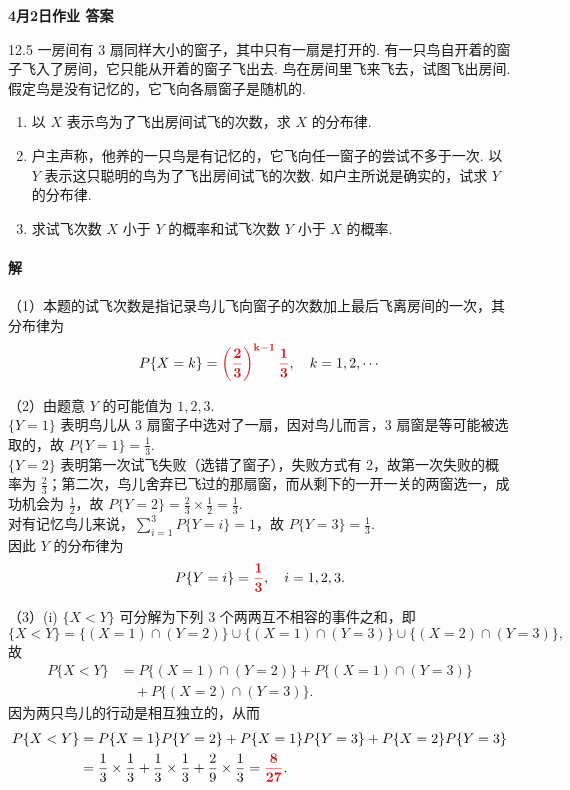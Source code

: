 \documentclass[11pt, UTF8]{ctexart}
\newcommand{\hwdate}{4月2日}
\newcommand{\ans}[1]{\mathbf{\color{fred}#1}}
\begin{document}
\begin{center}
    {\LARGE \bfseries \color{fblue} \hwdate 作业 答案}
\end{center}

\begin{problem}{1}{2.5}
一房间有 $3$ 扇同样大小的窗子，其中只有一扇是打开的. 有一只鸟自开着的窗子飞入了房间，它只能从开着的窗子飞出去. 鸟在房间里飞来飞去，试图飞出房间. 假定鸟是没有记忆的，它飞向各扇窗子是随机的.
\begin{enumerate}
    \item[(1)] 以 $X$ 表示鸟为了飞出房间试飞的次数，求 $X$ 的分布律.
    \item[(2)] 户主声称，他养的一只鸟是有记忆的，它飞向任一窗子的尝试不多于一次. 以 $Y$ 表示这只聪明的鸟为了飞出房间试飞的次数. 如户主所说是确实的，试求 $Y$ 的分布律.
    \item[(3)] 求试飞次数 $X$ 小于 $Y$ 的概率和试飞次数 $Y$ 小于 $X$ 的概率.
\end{enumerate}
\end{problem}

\paragraph{\color{fblue}解} 
（1）本题的试飞次数是指记录鸟儿飞向窗子的次数加上最后飞离房间的一次，其分布律为
\[ P\{X = k\} = \ans{\left(\frac{2}{3}\right)^{k-1} \frac{1}{3}}, \quad k = 1, 2, \cdots \]

（2）由题意 $Y$ 的可能值为 $1, 2, 3$. \\
$\{Y=1\}$ 表明鸟儿从 3 扇窗子中选对了一扇，因对鸟儿而言，3 扇窗是等可能被选取的，故 $P\{Y=1\}=\frac{1}{3}$. \\
$\{Y=2\}$ 表明第一次试飞失败（选错了窗子），失败方式有 2，故第一次失败的概率为 $\frac{2}{3}$；第二次，鸟儿舍弃已飞过的那扇窗，而从剩下的一开一关的两窗选一，成功机会为 $\frac{1}{2}$，故 $P\{Y=2\} = \frac{2}{3} \times \frac{1}{2} = \frac{1}{3}$. \\
对有记忆鸟儿来说，$\sum_{i=1}^{3} P\{Y=i\} = 1$，故 $P\{Y=3\} = \frac{1}{3}$. \\
因此 $Y$ 的分布律为
\[ P\{Y = i\} = \ans{\frac{1}{3}}, \quad i = 1, 2, 3. \]

（3）(i) $\{X<Y\}$ 可分解为下列 3 个两两互不相容的事件之和，即
\[ \{X < Y\} = \{(X = 1) \cap (Y = 2)\} \cup \{(X = 1) \cap (Y = 3)\} \cup \{(X = 2) \cap (Y = 3)\}, \]
故
\begin{align*}
    P\{X < Y\} &= P\{(X = 1) \cap (Y = 2)\} + P\{(X = 1) \cap (Y = 3)\} \\
    &\quad + P\{(X = 2) \cap (Y = 3)\}.
\end{align*}
因为两只鸟儿的行动是相互独立的，从而
\begin{align*}
    P\{X < Y\} &= P\{X=1\}P\{Y=2\} + P\{X=1\}P\{Y=3\} + P\{X=2\}P\{Y=3\} \\
    &= \frac{1}{3} \times \frac{1}{3} + \frac{1}{3} \times \frac{1}{3} + \frac{2}{9} \times \frac{1}{3} = \ans{\frac{8}{27}}.
\end{align*}
\end{document}
